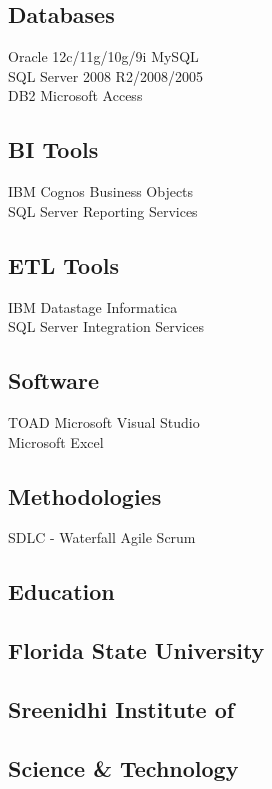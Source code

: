 \documentclass[]{deedy-resume-openfont}
\begin{document}
{\begin{minipage}[t]{0.31\textwidth}
\begin{mdframed}[hidealllines=true,backgroundcolor=gray!5]
\sectionsep

\subsection{Databases}
Oracle 12c/11g/10g/9i \textbullet{} MySQL \\
SQL Server 2008 R2/2008/2005\\
DB2 \textbullet{} Microsoft Access

\sectionsep

\subsection{BI Tools}
IBM Cognos \textbullet{}   Business Objects  \\
SQL Server Reporting Services
\sectionsep
\subsection{ETL Tools}
IBM Datastage \textbullet{} Informatica\\
SQL Server Integration Services
\sectionsep

\subsection{Software}
TOAD \textbullet{} Microsoft Visual Studio\\
Microsoft Excel
\sectionsep

\subsection{Methodologies}
SDLC - Waterfall \textbullet{} Agile \textbullet{} Scrum
\end{mdframed}
\vspace{-1.13em}
\begin{mdframed}[hidealllines=true,backgroundcolor=gray!5]
\section{Education} 

\subsection{Florida State University}
\sectionsep

\subsection{Sreenidhi Institute of}
\subsection{Science \& Technology}
\end{mdframed}
\end{minipage} }
\end{document}
